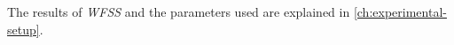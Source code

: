 The results of \textit{WFSS} and the parameters used are explained in
\autoref{ch:experimental-setup}.




